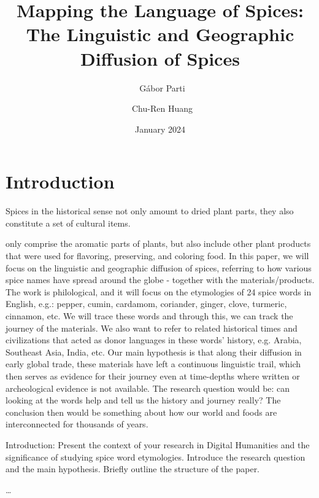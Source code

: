 \documentclass{dsh} %
\title{Mapping the Language of Spices: The Linguistic and Geographic Diffusion of Spices}
\author[1]{{\small\orcid{0000-0003-2042-4655}}~Gábor Parti}
\author[2]{{\small\orcid{0000-0002-8526-5520}}~Chu-Ren Huang}
\affil[1,2]{The Hong Kong Polytechnic University}
\date{\small{January 2024}}
\begin{document}
\maketitle

\begin{abstract}
\end{abstract}


\section{Introduction}

Spices in the historical sense not only amount to dried plant parts, they also constitute a set of cultural items. 

\autocite{vanwyk_2014_culinary}

only comprise the aromatic parts of plants, but also include other plant products that were used for flavoring, preserving, and coloring food. In this paper, we will focus on the linguistic and geographic diffusion of spices, referring to how various spice names have spread around the globe - together with the materials/products. The work is philological, and it will focus on the etymologies of 24 spice words in English, e.g.: pepper, cumin, cardamom, coriander, ginger, clove, turmeric, cinnamon, etc. We will trace these words and through this, we can track the journey of the materials. We also want to refer to related historical times and civilizations that acted as donor languages in these words' history, e.g. Arabia, Southeast Asia, India, etc. Our main hypothesis is that along their diffusion in early global trade, these materials have left a continuous linguistic trail, which then serves as evidence for their journey even at time-depths where written or archeological evidence is not available. The research question would be: can looking at the words help and tell us the history and journey really? The conclusion then would be something about how our world and foods are interconnected for thousands of years.







Introduction:
Present the context of your research in Digital Humanities and the significance of studying spice word etymologies.
Introduce the research question and the main hypothesis.
Briefly outline the structure of the paper.

\dots
\end{document}
